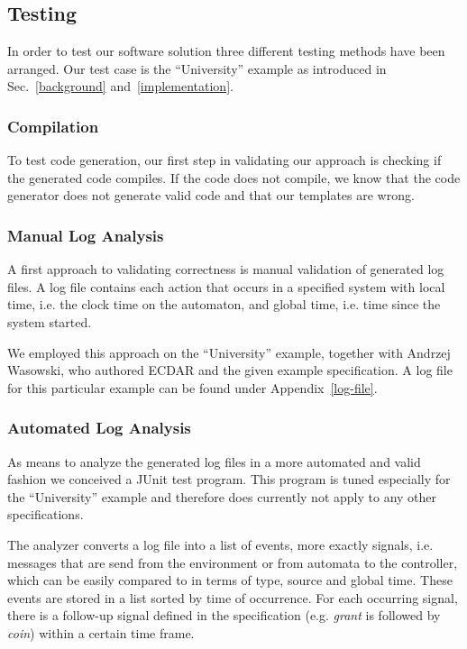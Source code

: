 \subsection{Testing}
\label{Testing}
In order to test our software solution three different testing methods have been
arranged. Our test case is the ``University'' example as introduced in
Sec.~\ref{background} and~\ref{implementation}.


\subsubsection{Compilation}

To test code generation, our first step in validating our approach is checking
if the generated code compiles. If the code does not compile, we know that the
code generator does not generate valid code and that our templates are wrong.


\subsubsection{Manual Log Analysis}

A first approach to validating correctness is manual validation of generated log
files. A log file contains each action that occurs in a specified system with
local time, i.e. the clock time on the automaton, and global time, i.e. time
since the system started.

We employed this approach on the ``University'' example, together with Andrzej
Wasowski, who authored ECDAR and the given example specification. A log file for
this particular example can be found under Appendix~\ref{log-file}.

\subsubsection{Automated Log Analysis}

As means to analyze the generated log files in a more automated and valid
fashion we conceived a JUnit test program. This program is tuned especially for
the ``University'' example and therefore does currently not apply to any other
specifications.

The analyzer converts a log file into a list of events, more exactly signals,
i.e. messages that are send from the environment or from automata to the
controller, which can be easily compared to in terms of type, source and global
time. These events are stored in a list sorted by time of occurrence. For each
occurring signal, there is a follow-up signal defined in the specification
(e.g. \emph{grant} is followed by \emph{coin}) within a certain time frame.

